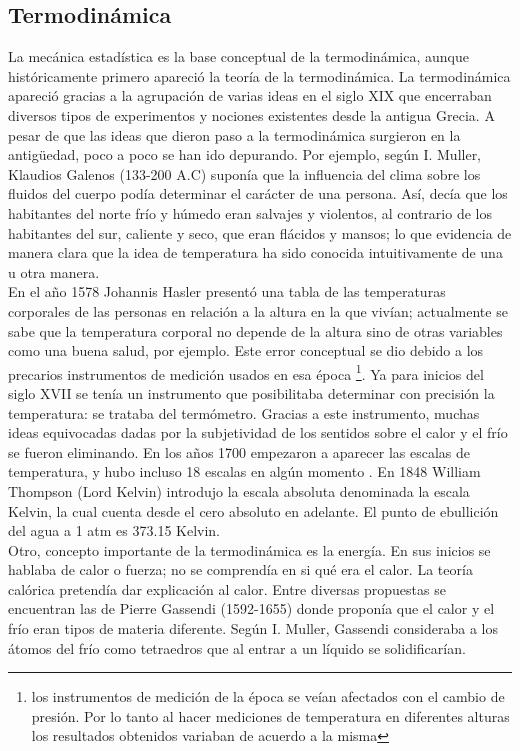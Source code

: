 \subsection{Termodinámica}
La mecánica estadística es la base conceptual de la termodinámica, aunque históricamente primero apareció la teoría de la termodinámica. La termodinámica apareció gracias a la agrupación de varias ideas en el siglo XIX que encerraban diversos tipos de experimentos y nociones existentes desde la antigua Grecia. A pesar de que las ideas que dieron paso a la termodinámica surgieron en la antigüedad, poco a poco se han ido depurando. Por ejemplo, según I. Muller, Klaudios Galenos (133-200 A.C) suponía que la influencia del clima sobre los fluidos del cuerpo podía determinar el carácter de una persona. Así, decía que los habitantes del norte frío y húmedo eran salvajes y violentos, al contrario de los habitantes del sur, caliente y seco, que eran flácidos y mansos; lo que evidencia de manera clara que la idea de temperatura ha sido conocida intuitivamente de una u otra manera. 
\\
En el año 1578 Johannis Hasler presentó una tabla de las temperaturas corporales de las personas en relación a la altura en la que vivían; actualmente se sabe que la temperatura corporal no depende de la altura sino de otras variables como una buena salud, por ejemplo. Este error conceptual se dio debido a los precarios instrumentos de medición usados en esa época \footnote{los instrumentos de medición de la época se veían afectados con el cambio de presión. Por lo tanto al hacer mediciones de temperatura en diferentes alturas los resultados obtenidos variaban de acuerdo a la misma}. Ya para inicios del siglo XVII se tenía un instrumento que posibilitaba determinar con precisión la temperatura: se trataba del termómetro. Gracias a este instrumento, muchas ideas equivocadas dadas por la subjetividad de los sentidos sobre el calor y el frío se fueron eliminando. En los años 1700 empezaron a aparecer las escalas de temperatura, y hubo incluso 18 escalas en algún momento \cite{MullerHistory}. En 1848 William Thompson (Lord Kelvin) introdujo la escala absoluta denominada la escala Kelvin, la cual cuenta desde el cero absoluto en adelante. El punto de ebullición del agua a 1 atm es 373.15 Kelvin.
\\
Otro, concepto importante de la termodinámica es la energía. En sus inicios se hablaba de calor o fuerza; no se comprendía en si qué era el calor. La teoría calórica pretendía dar explicación al calor. Entre diversas propuestas se encuentran las de Pierre Gassendi (1592-1655) donde proponía que el calor y el frío eran tipos de materia diferente. Según I. Muller, Gassendi consideraba a los átomos del frío como tetraedros que al entrar a un líquido se solidificarían.
